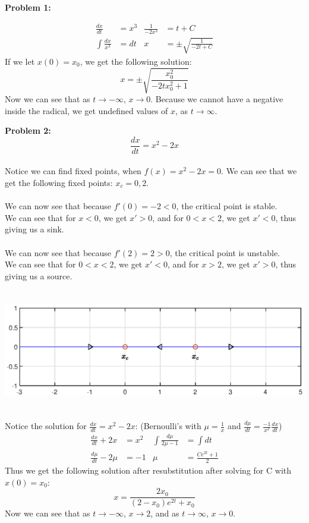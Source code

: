 \documentclass[11pt]{article}
\newenvironment{problem}[1]{\textbf{Problem #1: }}{\newpage}
\begin{document}
\begin{problem}{1}
\begin{enumerate}[label = (\alph*)]
\begin{enumerate}[label = (\roman*)]
				\begin{align*}
					\frac{dx}{dt} &= x^3 & \frac{1}{-2x^2} &= t + C \\
					\int \frac{dx}{x^3} &= dt & x &= \pm\sqrt{\frac{1}{-2t + C} }
				\end{align*}
				If we let $x(0) = x_0$, we get the following solution:
				$$x = \pm\sqrt{\frac{x_0^2}{-2tx_0^2 + 1} }$$
				Now we can see that as $t \rightarrow -\infty$, $x \rightarrow 0$. Because we cannot have a negative inside the radical, we get undefined values of $x$, as $t \rightarrow \infty$.
			\end{enumerate}
		\end{enumerate}
	\end{problem}
	
	\begin{problem}{2}
		$$\frac{dx}{dt} = x^2 - 2x$$
		\\
		Notice we can find fixed points, when $f(x) = x^2 - 2x = 0$.  We can see that we get the following fixed points: $x_c = 0, 2$.
		\\ \\ 
		We can now see that because $f'(0) = -2 < 0$, the critical point is stable. 
		\\ 
		We can see that for $x < 0$, we get $x' > 0$, and for $0 < x < 2$, we get $x' <  0$, thus giving us a sink.
		\\ \\
		We can now see that because $f'(2) = 2 > 0$, the critical point is unstable. 
		\\ 
		We can see that for $0 < x < 2$, we get $x' < 0$, and for $x > 2$, we get $x' >  0$, thus giving us a source.
		\\ \\
		\includegraphics[width = 16cm, height = 5cm]{PhaseLine2.eps}
		\\ \\
		Notice the solution for $\frac{dx}{dt} = x^2 - 2x$: (Bernoulli's with $\mu = \frac{1}{x}$ and $\frac{d\mu}{dt} = \frac{-1}{x^2}\frac{dx}{dt}$)
			\begin{align*}
				\frac{dx}{dt} + 2x &= x^2 & \int \frac{d\mu}{2\mu - 1} &= \int dt\\
				\frac{d\mu}{dt} - 2\mu &= - 1 & \mu &= \frac{Ce^{2t} + 1}{2}
			\end{align*}
		Thus we get the following solution after resubstitution after solving for C with $x(0) = x_0$:
			$$x = \frac{2x_0}{(2 - x_0)e^{2t} + x_0} $$
		Now we can see that as $t \rightarrow -\infty$, $x \rightarrow 2$, and as $t \rightarrow \infty$, $x \rightarrow 0$. 
	\end{problem}
	
\end{document}
